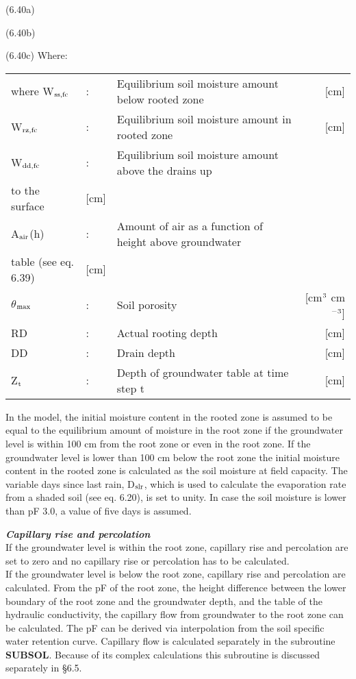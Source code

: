  
\strut\hfill (6.40a)\\
\strut\hfill (6.40b)\\
\strut\hfill (6.40c)
Where:\\
\begin{tabularx}{\textwidth}{llXr}



where W$_{{\rm ss,fc}}$ &:& Equilibrium soil moisture amount below rooted zone  & [cm]\\
W$_{{\rm rz,fc}}$ &:& Equilibrium soil moisture amount in rooted zone  & [cm]\\
W$_{{\rm dd,fc}}$ &:& Equilibrium soil moisture amount above the drains up \\
   to the surface  & [cm]\\
A$_{{\rm air}}$(h) &:& Amount of air as a function of height above groundwater\\
   table (see eq. 6.39)  & [cm]\\
$\theta$$_{{\rm max}}$ &:& Soil porosity  & [cm$^{{\rm 3}}$ cm$^{{\rm -3}}$]\\
RD &:& Actual rooting depth  & [cm]\\
DD &:& Drain depth  & [cm]\\
Z$_{{\rm t}}$ &:& Depth of groundwater table at time step t  & [cm]
\end{tabularx}



In the model, the initial moisture content in the rooted zone is assumed to be equal to the
equilibrium amount of moisture in the root zone if the groundwater level is within 100 cm
from the root zone or even in the root zone. If the groundwater level is lower than 100
cm below the root zone the initial moisture content in the rooted zone is calculated as the
soil moisture at field capacity. The variable days since last rain, D$_{{\rm slr}}$, which is used to
calculate the evaporation rate from a shaded soil (see eq. 6.20), is set to unity. In case the
soil moisture is lower than pF 3.0, a value of five days is assumed.



{\bf {\it Capillary rise and percolation\/}}\\
If the groundwater level is within the root zone, capillary rise and percolation are set to
zero and no capillary rise or percolation has to be calculated. \\
If the groundwater level is below the root zone, capillary rise and percolation are
calculated. From the pF of the root zone, the height difference between the lower
boundary of the root zone and the groundwater depth, and the table of the hydraulic
conductivity, the capillary flow from groundwater to the root zone can be calculated. The
pF can be derived via interpolation from the soil specific water retention curve. Capillary
flow is calculated separately in the subroutine {\bf SUBSOL}. Because of its complex calcula\-tions this subroutine is discussed separately in \S 6.5. 








